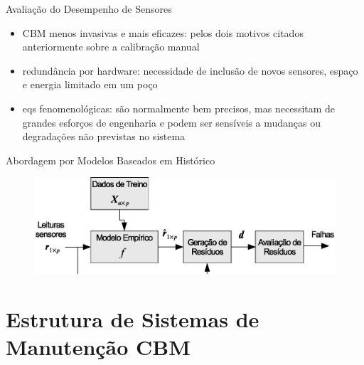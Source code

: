 \documentclass{beamer}
\begin{document}
\begin{frame}{Avaliação do Desempenho de Sensores}
{\begin{itemize}
        \item CBM menos invasivas e mais eficazes: pelos dois motivos citados
            anteriormente sobre a calibração manual
            \vspace{15pt}
        \item redundância por hardware: necessidade de inclusão de novos sensores, espaço
            e energia limitado em um poço
        \item eqs fenomenológicas: são normalmente bem precisos, mas necessitam de grandes
            esforços de engenharia e podem ser sensíveis a mudanças ou degradações não
            previstas no sistema
    \end{itemize}}
    
\end{frame}

\begin{frame}{Abordagem por Modelos Baseados em Histórico}
    
    \begin{figure}[!htb]
        \centering\hspace*{-20pt}
        \includegraphics[width=1.1\textwidth]{figuras/data_driven_fdd.eps}
    \end{figure}
    
\end{frame}


\section{Estrutura de Sistemas de Manutenção CBM}
\end{document}
